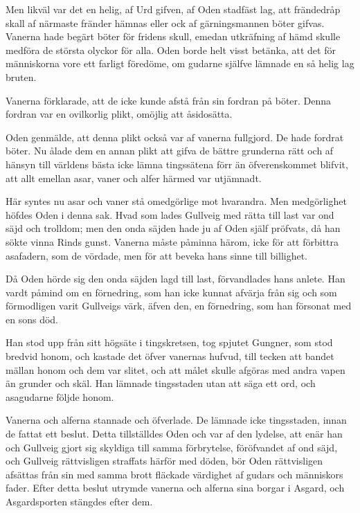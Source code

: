 Men likväl var det en helig, af Urd gifven, af Oden stadfäst lag, att
frändedråp skall af närmaste fränder hämnas eller ock af gärningsmannen
böter gifvas. Vanerna hade begärt böter för fridens skull, emedan
utkräfning af hämd skulle medföra de största olyckor för alla. Oden
borde helt visst betänka, att det för människorna vore ett farligt
föredöme, om gudarne själfve lämnade en så helig lag bruten.

Vanerna förklarade, att de icke kunde afstå från sin fordran på böter.
Denna fordran var en ovilkorlig plikt, omöjlig att åsidosätta.

Oden genmälde, att denna plikt också var af vanerna fullgjord. De hade
fordrat böter. Nu ålade dem en annan plikt att gifva de bättre grunderna
rätt och af hänsyn till världens bästa icke lämna tingssätena förr än
öfverenskommet blifvit, att allt emellan asar, vaner och alfer härmed
var utjämnadt.

Här syntes nu asar och vaner stå omedgörlige mot hvarandra. Men
medgörlighet höfdes Oden i denna sak. Hvad som lades Gullveig med rätta
till last var ond säjd och
trolldom;
men den onda säjden hade ju af Oden själf pröfvats, då han sökte vinna
Rinds gunst. Vanerna måste påminna härom, icke för att förbittra
asafadern, som de vördade, men för att beveka hans sinne till billighet.

Då Oden hörde sig den onda säjden lagd till last, förvandlades hans
anlete. Han vardt påmind om en förnedring, som han icke kunnat afvärja
från sig och som förmodligen varit Gullveigs värk, äfven den, en
förnedring, som han försonat med en sons död.

Han stod upp från sitt högsäte i tingskretsen, tog spjutet Gungner, som
stod bredvid honom, och kastade det öfver vanernas hufvud, till tecken
att bandet mällan honom och dem var slitet, och att målet skulle afgöras
med andra vapen än grunder och skäl. Han lämnade tingsstaden utan att
säga ett ord, och asagudarne följde honom.

Vanerna och alferna stannade och öfverlade. De lämnade icke tingsstaden,
innan de fattat ett beslut. Detta tillställdes Oden och var af den
lydelse, att enär han och Gullveig gjort sig skyldiga till samma
förbrytelse, föröfvandet af ond säjd, och Gullveig rättvisligen
straffats härför med döden, bör Oden rättvisligen afsättas från sin med
samma brott fläckade värdighet af gudars och människors fader. Efter
detta beslut utrymde vanerna och alferna sina borgar i Asgard, och
Asgardsporten stängdes efter dem.


